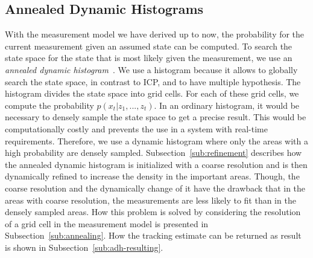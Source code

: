 \documentclass[twoside,a4paper,article]{combine}
\begin{document}
\subsection{Annealed Dynamic Histograms}
\label{sub:adh}
With the measurement model we have derived up to now, the probability
for the current measurement given an assumed state can be computed. To
search the state space for the state that is most likely given the
measurement, we use an \textit{annealed dynamic
  histogram}~\cite{paper}. We use a histogram because it allows to
globally search the state space, in contrast to ICP, and to have
multiple hypothesis. The histogram divides the state space into grid
cells. For each of these grid cells, we compute the probability
$p(x_t|z_1,...,z_t)$. In an ordinary histogram, it would be necessary
to densely sample the state space to get a precise result. This would
be computationally costly and prevents the use in a system with
real-time requirements. Therefore, we use a dynamic histogram where
only the areas with a high probability are densely
sampled. Subsection~\ref{sub:refinement} describes how the annealed
dynamic histogram is initialized with a coarse resolution and is then
dynamically refined to increase the density in the important
areas. Though, the coarse resolution and the dynamically change of it
have the drawback that in the areas with coarse resolution, the
measurements are less likely to fit than in the densely sampled
areas. How this problem is solved by considering the resolution of a
grid cell in the measurement model is presented in
Subsection~\ref{sub:annealing}. How the tracking estimate can be
returned as result is shown in Subsection~\ref{sub:adh-resulting}.
\end{document}
